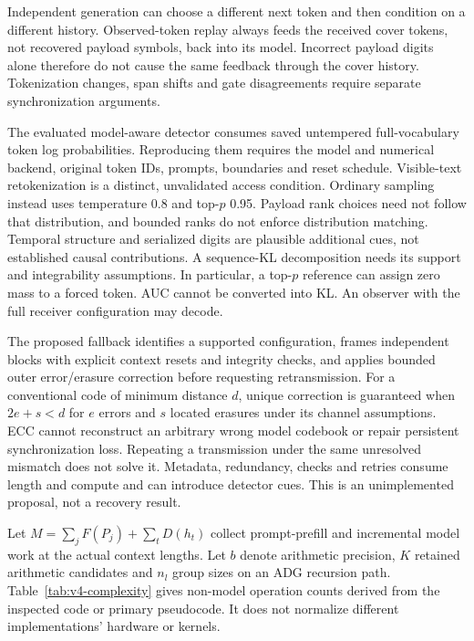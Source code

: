 Independent generation can choose a different next token and then condition on a different history. Observed-token replay always feeds the received cover tokens, not recovered payload symbols, back into its model. Incorrect payload digits alone therefore do not cause the same feedback through the cover history. Tokenization changes, span shifts and gate disagreements require separate synchronization arguments.

The evaluated model-aware detector consumes saved untempered full-vocabulary token log probabilities. Reproducing them requires the model and numerical backend, original token IDs, prompts, boundaries and reset schedule. Visible-text retokenization is a distinct, unvalidated access condition. Ordinary sampling instead uses temperature 0.8 and top-\(p\) 0.95. Payload rank choices need not follow that distribution, and bounded ranks do not enforce distribution matching. Temporal structure and serialized digits are plausible additional cues, not established causal contributions. A sequence-KL decomposition needs its support and integrability assumptions. In particular, a top-\(p\) reference can assign zero mass to a forced token. AUC cannot be converted into KL. An observer with the full receiver configuration may decode.

The proposed fallback identifies a supported configuration, frames independent blocks with explicit context resets and integrity checks, and applies bounded outer error/erasure correction before requesting retransmission. For a conventional code of minimum distance \(d\), unique correction is guaranteed when \(2e+s<d\) for \(e\) errors and \(s\) located erasures under its channel assumptions. ECC cannot reconstruct an arbitrary wrong model codebook or repair persistent synchronization loss. Repeating a transmission under the same unresolved mismatch does not solve it. Metadata, redundancy, checks and retries consume length and compute and can introduce detector cues. This is an unimplemented proposal, not a recovery result.

Let \(M=\sum_j F(P_j)+\sum_t D(h_t)\) collect prompt-prefill and incremental model work at the actual context lengths. Let \(b\) denote arithmetic precision, \(K\) retained arithmetic candidates and \(n_l\) group sizes on an ADG recursion path. Table~\ref{tab:v4-complexity} gives non-model operation counts derived from the inspected code or primary pseudocode. It does not normalize different implementations' hardware or kernels.

